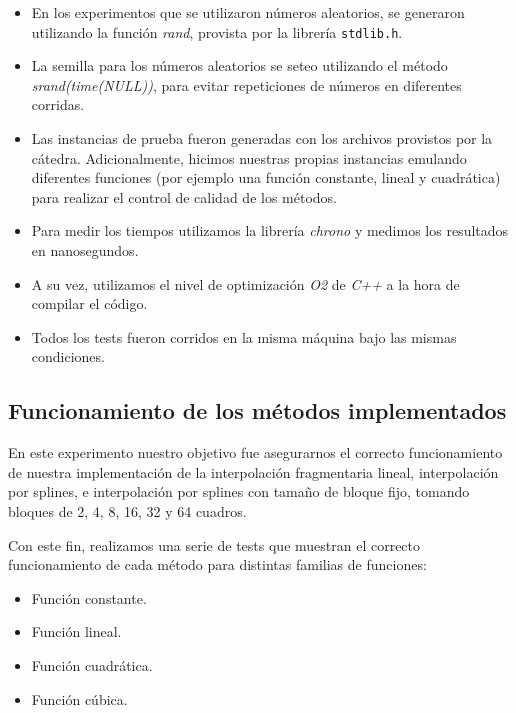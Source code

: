 \begin{itemize}
    \item En los experimentos que se utilizaron números aleatorios, se generaron utilizando la función \textit{rand}, provista por la librería \texttt{stdlib.h}.
    \item La semilla para los números aleatorios se seteo utilizando el método \textit{srand(time(NULL))}, para evitar repeticiones de números en diferentes corridas.
    \item Las instancias de prueba fueron generadas con los archivos provistos por la cátedra. Adicionalmente, hicimos nuestras propias instancias emulando diferentes funciones (por ejemplo una función constante, lineal y cuadrática) para realizar el control de calidad de los métodos.
    \item Para medir los tiempos utilizamos la librería \textit{chrono} y medimos los resultados en nanosegundos.
    \item A su vez, utilizamos el nivel de optimización \textit{O2} de \textit{C++} a la hora de compilar el código.
    \item Todos los tests fueron corridos en la misma máquina bajo las mismas condiciones.
\end{itemize}


\subsection{Funcionamiento de los métodos implementados}\label{exp_funcionamiento}
En este experimento nuestro objetivo fue asegurarnos el correcto funcionamiento de nuestra implementación de la interpolación fragmentaria lineal, interpolación por splines, e interpolación por splines con tamaño de bloque fijo, tomando bloques de 2, 4, 8, 16, 32 y 64 cuadros.

Con este fin, realizamos una serie de tests que muestran el correcto funcionamiento de cada método para distintas familias de funciones:
\begin{itemize}
  \item Función constante.
  \item Función lineal.
  \item Función cuadrática.
  \item Función cúbica.
\end{itemize}

